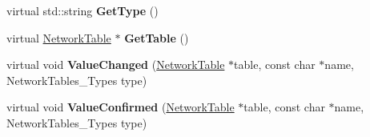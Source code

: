 \begin{DoxyCompactItemize}
\item 
\hypertarget{classCommand_a36d05a368c69528229a6b4938bc4dadd}{
virtual std::string {\bfseries GetType} ()}
\label{classCommand_a36d05a368c69528229a6b4938bc4dadd}

\item 
\hypertarget{classCommand_ac9a018d88222c9c2b9e8f4a73f46fa23}{
virtual \hyperlink{classNetworkTable}{NetworkTable} $\ast$ {\bfseries GetTable} ()}
\label{classCommand_ac9a018d88222c9c2b9e8f4a73f46fa23}

\item 
\hypertarget{classCommand_a18ebf33e40641b7305abcb3109593382}{
virtual void {\bfseries ValueChanged} (\hyperlink{classNetworkTable}{NetworkTable} $\ast$table, const char $\ast$name, NetworkTables\_\-Types type)}
\label{classCommand_a18ebf33e40641b7305abcb3109593382}

\item 
\hypertarget{classCommand_a64031d0cff1615ec0f42b37b764232b8}{
virtual void {\bfseries ValueConfirmed} (\hyperlink{classNetworkTable}{NetworkTable} $\ast$table, const char $\ast$name, NetworkTables\_\-Types type)}
\label{classCommand_a64031d0cff1615ec0f42b37b764232b8}

\end{DoxyCompactItemize}
